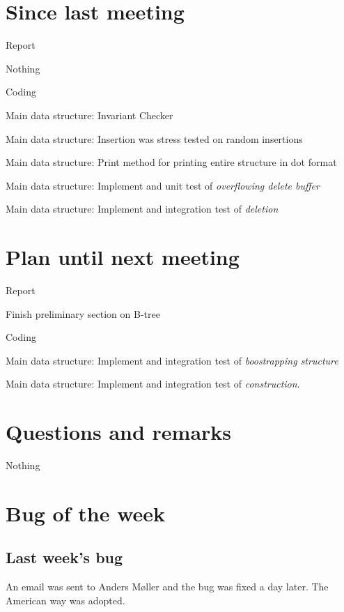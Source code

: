 \documentclass[a4paper,11pt,agenda,chair]{meetingmins}
\begin{document}
\maketitle

\section{Since last meeting}
\begin{items}
\item Report
	\begin{items}
		\item Nothing
	\end{items}
\item Coding
	\begin{items}
		\item Main data structure: Invariant Checker
		\item Main data structure: Insertion was stress tested on random insertions
		\item Main data structure: Print method for printing entire structure in dot format
		\item Main data structure: Implement and unit test of \textit{overflowing delete buffer}
		\item Main data structure: Implement and integration test of \textit{deletion}
	\end{items}
\end{items}

\section{Plan until next meeting}
\begin{items}
\item Report
	\begin{items}
		\item Finish preliminary section on B-tree
	\end{items}
\item Coding
	\begin{items}
		\item Main data structure: Implement and integration test of \textit{boostrapping structure}
		\item Main data structure: Implement and integration test of \textit{construction}.
	\end{items}
\end{items}

\section{Questions and remarks}
\begin{items}
	\item Nothing
\end{items}



\section{Bug of the week}
\subsection{Last week's bug}
An email was sent to Anders M\o ller and the bug was fixed a day later. The American way was adopted.
\end{document}

